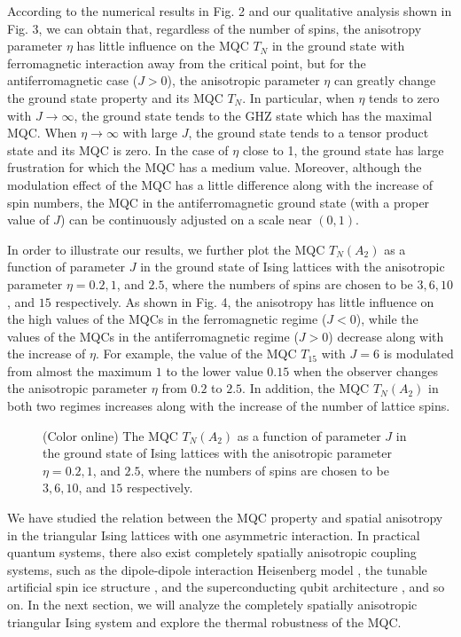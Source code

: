 \documentclass[pra,aps,twocolumn,showpacs]{revtex4}
\begin{document}
According to the numerical results in Fig. 2 and our qualitative analysis shown in Fig. 3, we can obtain that, regardless of the number of spins, the anisotropy parameter $\eta$ has little influence on the MQC $T_{N}$ in the ground state with ferromagnetic interaction away from the critical point, but for the antiferromagnetic case ($J>0$), the anisotropic parameter $\eta$ can greatly change the ground state property and its MQC $T_N$. In particular, when $\eta$ tends to zero with $J\rightarrow \infty$, the ground state tends to the GHZ state which has the maximal MQC. When $\eta\rightarrow \infty$ with large $J$, the ground state tends to a tensor product state and its MQC is zero. In the case of $\eta$ close to 1, the ground state has large frustration for which the MQC has a medium value. Moreover, although the modulation effect of the MQC has a little difference along with the increase of spin numbers, the MQC in the antiferromagnetic ground state (with a proper value of $J$) can be continuously adjusted on a scale near $(0,1)$.

In order to illustrate our results, we further plot the MQC $T_N(A_2)$ as a function of parameter $J$ in the ground state of Ising lattices with the anisotropic parameter $\eta=0.2, 1$, and $2.5$, where the numbers of spins are chosen to be $3,6,10$, and $15$ respectively. As shown in Fig. 4, the anisotropy has little influence on the high values of the MQCs in the ferromagnetic regime ($J<0$), while the values of the MQCs in the antiferromagnetic regime ($J>0$) decrease along with the increase of $\eta$. For example, the value of the MQC $T_{15}$ with $J=6$ is modulated from almost the maximum $1$ to the lower value $0.15$ when the observer changes the anisotropic parameter $\eta$ from $0.2$ to $2.5$. In addition, the MQC $T_{N}(A_2)$ in both two regimes increases along with the increase of the number of lattice spins.

\begin{figure}
	\caption{(Color online) The MQC $T_N(A_2)$ as a function of parameter $J$ in the ground state of Ising lattices with the anisotropic parameter $\eta=0.2, 1$, and $2.5$, where the numbers of spins are chosen to be $3,6,10$, and $15$ respectively.}
\end{figure}

We have studied the relation between the MQC property and spatial anisotropy in the triangular Ising lattices with one asymmetric interaction. In practical quantum systems, there also exist completely spatially anisotropic coupling systems, such as the dipole-dipole interaction Heisenberg model \cite{Keles18prl}, the tunable artificial spin ice structure \cite{Tala20prapp}, and the superconducting qubit architecture \cite{Grosz11prb}, and so on. In the next section, we will analyze the completely spatially anisotropic triangular Ising system and explore the thermal robustness of the MQC.
\end{document}
